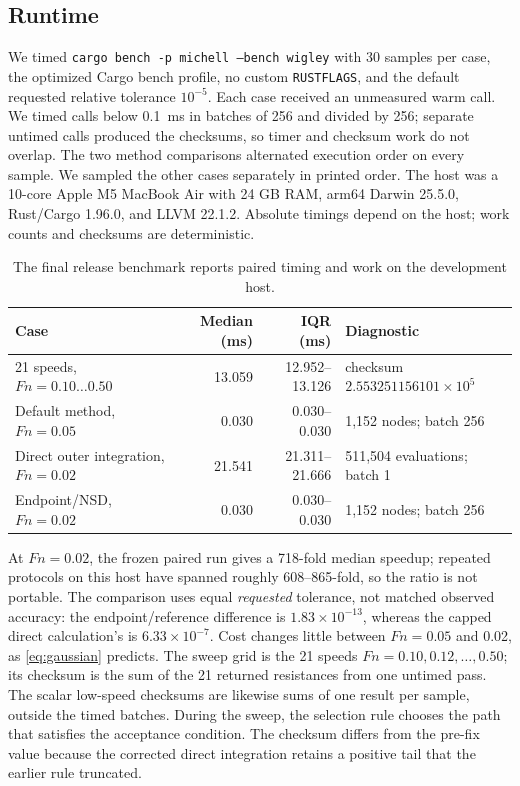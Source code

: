 \documentclass[10pt]{article}
\newcommand{\Fn}{\mathit{Fn}}
\begin{document}
\subsection{Runtime}

We timed \texttt{cargo bench -p michell --bench wigley} with 30 samples per
case, the optimized Cargo bench profile, no custom \texttt{RUSTFLAGS}, and the
default requested relative tolerance \(10^{-5}\).  Each case received an
unmeasured warm call.  We timed calls below \SI{0.1}{ms} in batches of 256 and
divided by 256; separate untimed calls produced the checksums, so timer and
checksum work do not overlap.  The two method comparisons alternated execution
order on every sample.  We sampled the other cases separately in printed
order.  The host was a 10-core Apple M5 MacBook Air with 24 GB RAM, arm64
Darwin 25.5.0, Rust/Cargo 1.96.0, and LLVM 22.1.2.  Absolute timings depend on
the host; work counts and checksums are deterministic.

\begin{table}[t]
\centering
\caption{The final release benchmark reports paired timing and work on the
development host.}
\label{tab:timing}
\begin{tabular}{@{}lrrl@{}}
\toprule
Case & Median (ms) & IQR (ms) & Diagnostic\\
\midrule
21 speeds, \(\Fn=0.10\ldots0.50\) & 13.059 & 12.952--13.126 & checksum \(2.553251156101\times10^5\)\\
Default method, \(\Fn=0.05\) & 0.030 & 0.030--0.030 & 1,152 nodes; batch 256\\
Direct outer integration, \(\Fn=0.02\) & 21.541 & 21.311--21.666 & 511,504 evaluations; batch 1\\
Endpoint/NSD, \(\Fn=0.02\) & 0.030 & 0.030--0.030 & 1,152 nodes; batch 256\\
\bottomrule
\end{tabular}
\end{table}

At \(\Fn=0.02\), the frozen paired run gives a 718-fold median speedup; repeated
protocols on this host have spanned roughly 608--865-fold, so the ratio is not
portable.  The comparison uses equal \emph{requested} tolerance, not matched
observed accuracy: the endpoint/reference difference is
\(1.83\times10^{-13}\), whereas the capped direct calculation's is
\(6.33\times10^{-7}\).  Cost changes little between \(\Fn=0.05\) and 0.02, as
\cref{eq:gaussian} predicts.  The sweep grid is the 21 speeds
\(\Fn=0.10,0.12,\ldots,0.50\); its checksum is the sum of the 21 returned
resistances from one untimed pass.  The scalar low-speed checksums are likewise
sums of one result per sample, outside the timed batches.  During the sweep,
the selection rule chooses the path that satisfies the acceptance condition.
The checksum differs from the pre-fix value because the corrected direct
integration retains a positive tail that the earlier rule truncated.
\end{document}
